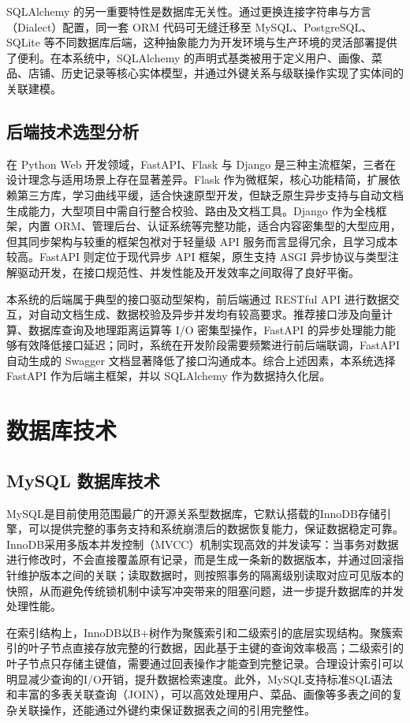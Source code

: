SQLAlchemy 的另一重要特性是数据库无关性。通过更换连接字符串与方言（Dialect）配置，同一套 ORM 代码可无缝迁移至 MySQL、PostgreSQL、SQLite 等不同数据库后端，这种抽象能力为开发环境与生产环境的灵活部署提供了便利。在本系统中，SQLAlchemy 的声明式基类被用于定义用户、画像、菜品、店铺、历史记录等核心实体模型，并通过外键关系与级联操作实现了实体间的关联建模。

\subsection{后端技术选型分析}

在 Python Web 开发领域，FastAPI、Flask 与 Django 是三种主流框架，三者在设计理念与适用场景上存在显著差异。Flask 作为微框架，核心功能精简，扩展依赖第三方库，学习曲线平缓，适合快速原型开发，但缺乏原生异步支持与自动文档生成能力，大型项目中需自行整合校验、路由及文档工具。Django 作为全栈框架，内置 ORM、管理后台、认证系统等完整功能，适合内容密集型的大型应用，但其同步架构与较重的框架包袱对于轻量级 API 服务而言显得冗余，且学习成本较高。FastAPI 则定位于现代异步 API 框架，原生支持 ASGI 异步协议与类型注解驱动开发，在接口规范性、并发性能及开发效率之间取得了良好平衡。

本系统的后端属于典型的接口驱动型架构，前后端通过 RESTful API 进行数据交互，对自动文档生成、数据校验及异步并发均有较高要求。推荐接口涉及向量计算、数据库查询及地理距离运算等 I/O 密集型操作，FastAPI 的异步处理能力能够有效降低接口延迟；同时，系统在开发阶段需要频繁进行前后端联调，FastAPI 自动生成的 Swagger 文档显著降低了接口沟通成本。综合上述因素，本系统选择 FastAPI 作为后端主框架，并以 SQLAlchemy 作为数据持久化层。


\section{数据库技术}

\subsection{MySQL 数据库技术}
MySQL是目前使用范围最广的开源关系型数据库，它默认搭载的InnoDB存储引擎，可以提供完整的事务支持和系统崩溃后的数据恢复能力，保证数据稳定可靠。InnoDB采用多版本并发控制（MVCC）机制实现高效的并发读写：当事务对数据进行修改时，不会直接覆盖原有记录，而是生成一条新的数据版本，并通过回滚指针维护版本之间的关联；读取数据时，则按照事务的隔离级别读取对应可见版本的快照，从而避免传统锁机制中读写冲突带来的阻塞问题，进一步提升数据库的并发处理性能。

在索引结构上，InnoDB以B+树作为聚簇索引和二级索引的底层实现结构。聚簇索引的叶子节点直接存放完整的行数据，因此基于主键的查询效率极高；二级索引的叶子节点只存储主键值，需要通过回表操作才能查到完整记录。合理设计索引可以明显减少查询的I/O开销，提升数据检索速度。此外，MySQL支持标准SQL语法和丰富的多表关联查询（JOIN），可以高效处理用户、菜品、画像等多表之间的复杂关联操作，还能通过外键约束保证数据表之间的引用完整性。

